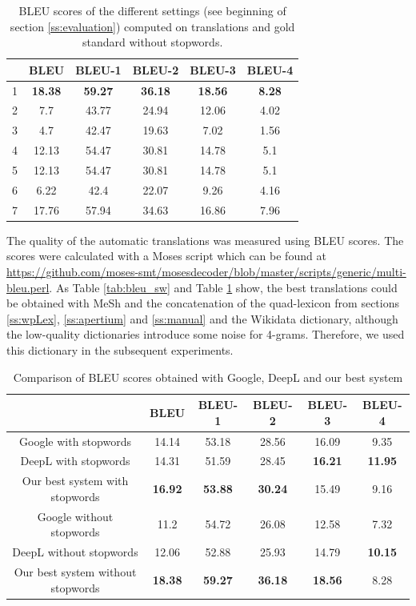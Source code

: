 \documentclass[a4paper,11pt]{article}
\begin{document}
\begin{table}[t]
	\begin{tabular}{c|c|c|c|c|c}
		&BLEU & BLEU-1 & BLEU-2 & BLEU-3 & BLEU-4\\
		\hline
		1 & \textbf{18.38} & \textbf{59.27} & \textbf{36.18} & \textbf{18.56} & \textbf{8.28}\\
		2 & 7.7	& 43.77 & 24.94 & 12.06 & 4.02\\
		3 & 4.7	& 42.47 & 19.63 & 7.02 & 1.56\\
		4 & 12.13 &	54.47 & 30.81 & 14.78 & 5.1\\
		5 & 12.13 &	54.47 & 30.81 & 14.78 & 5.1\\
		6 & 6.22 & 42.4 & 22.07 & 9.26 & 4.16\\
		7 & 17.76 & 57.94 & 34.63 & 16.86 & 7.96\\
	\end{tabular}
	\caption{BLEU scores of the different settings (see beginning of section \ref{ss:evaluation}) computed on translations and gold standard without stopwords.}
	\label{tab:bleu_without_sw}
\end{table}


The quality of the automatic translations was measured using BLEU scores. The scores were calculated with a Moses script which can be found at \url{https://github.com/moses-smt/mosesdecoder/blob/master/scripts/generic/multi-bleu.perl}.
As Table \ref{tab:bleu_sw} and Table \ref{tab:bleu_without_sw} show, the best translations could be obtained with MeSh and the concatenation of the quad-lexicon from sections \ref{ss:wpLex}, \ref{ss:apertium} and \ref{ss:manual} and the Wikidata dictionary, although the low-quality dictionaries introduce some noise for 4-grams. Therefore, we used this dictionary in the subsequent experiments.

\begin{table}[t]
	\begin{tabular}{c|c|c|c|c|c}
		&BLEU & BLEU-1 & BLEU-2 & BLEU-3 & BLEU-4\\
		\hline
		Google with stopwords & 14.14 &	53.18 & 28.56 & 16.09 & 9.35\\
		DeepL with stopwords & 14.31 & 51.59 & 28.45 & \textbf{16.21} & \textbf{11.95}\\
		Our best system with stopwords & \textbf{16.92} & \textbf{53.88} & \textbf{30.24} & 15.49 & 9.16\\
		\hline
		Google without stopwords & 11.2	& 54.72 & 26.08 & 12.58 & 7.32\\
		DeepL without stopwords & 12.06	& 52.88 & 25.93 & 14.79 & \textbf{10.15}\\
		Our best system without stopwords & \textbf{18.38} & \textbf{59.27} & \textbf{36.18} & \textbf{18.56} & 8.28\\
	\end{tabular}
	\caption{Comparison of BLEU scores obtained with Google, DeepL and our best system}
	\label{tab:Google_DeepL}
\end{table}
\end{document}
